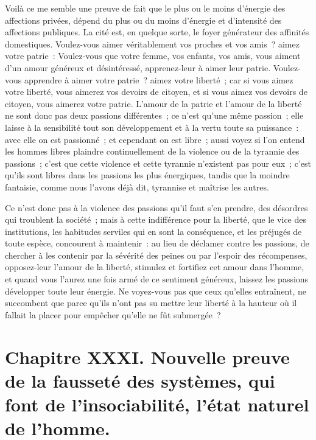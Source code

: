 \documentclass[french,twoside]{book} %
\newcommand\chapteropen{} %
\newcommand\chapterclose{} %
\begin{document}
Voilà ce me semble une preuve de fait que le plus ou le moins d’énergie des affections privées, dépend du plus ou du moins d’énergie et d’intensité des affections publiques. La cité est, en quelque sorte, le foyer générateur des affinités domestiques. Voulez-vous aimer véritablement vos proches et vos amis ? aimez votre patrie : Voulez-vous que votre femme, vos enfants, vos amis, vous aiment d’un amour généreux et désintéressé, apprenez-leur à aimer leur patrie. Voulez-vous apprendre à aimer votre patrie ? aimez votre liberté ; car si vous aimez votre liberté, vous aimerez vos devoirs de citoyen, et si vous aimez vos devoirs de citoyen, vous aimerez votre patrie. L’amour de la patrie et l’amour de la liberté ne sont donc pas deux passions différentes ; ce n’est qu’une même passion ; elle laisse à la sensibilité tout son développement et à la vertu toute sa puissance : avec elle on est passionné ; et cependant on est libre ; aussi voyez si l’on entend les hommes libres plaindre continuellement de la violence ou de la tyrannie des passions ; c’est que cette violence et cette tyrannie n’existent pas pour eux ; c’est qu’ils sont libres dans les passions les plus énergiques, tandis que la moindre fantaisie, comme nous l’avons déjà dit, tyrannise et maîtrise les autres.\par
Ce n’est donc pas à la violence des passions qu’il faut s’en prendre, des désordres qui troublent la société ; mais à cette indifférence pour la liberté, que le vice des institutions, les habitudes serviles qui en sont la conséquence, et les préjugés de toute espèce, concourent à maintenir : au lieu de déclamer contre les passions, de chercher à les contenir par la sévérité des peines ou par l’espoir des récompenses, opposez-leur l’amour de la liberté, stimulez et fortifiez cet amour dans l’homme, et quand vous l’aurez une fois armé de ce sentiment généreux, laissez les passions développer toute leur énergie. Ne voyez-vous pas que ceux qu’elles entraînent, ne succombent que parce qu’ils n’ont pas su mettre leur liberté à la hauteur où il fallait la placer pour empêcher qu’elle ne fût submergée ?
\chapterclose


\chapteropen
\chapter[{Chapitre XXXI. Nouvelle preuve de la fausseté des systèmes, qui font de l’insociabilité, l’état naturel de l’homme.}]{Chapitre XXXI. Nouvelle preuve de la fausseté des systèmes, qui font de l’insociabilité, l’état naturel de l’homme.}\renewcommand{\leftmark}{Chapitre XXXI. Nouvelle preuve de la fausseté des systèmes, qui font de l’insociabilité, l’état naturel de l’homme.}
\end{document}
